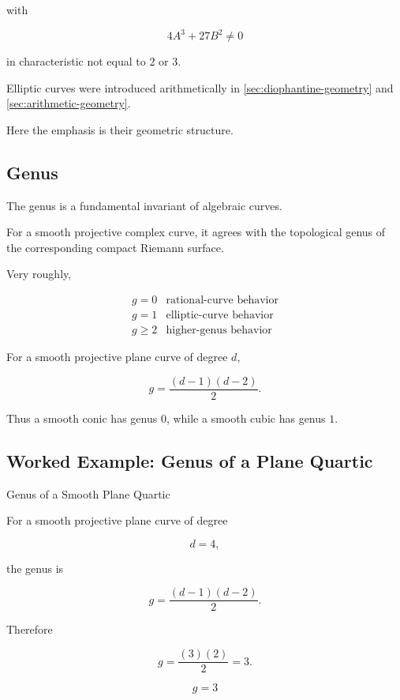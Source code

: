 with

\[
4A^3+27B^2\neq0
\]

in characteristic not equal to \(2\) or \(3\).

Elliptic curves were introduced arithmetically in
\cref{sec:diophantine-geometry} and
\cref{sec:arithmetic-geometry}.

Here the emphasis is their geometric structure.

\subsection{Genus}
\label{subsec:algebraic-genus}

The genus is a fundamental invariant of algebraic curves.

For a smooth projective complex curve, it agrees with the topological genus
of the corresponding compact Riemann surface.

Very roughly,

\[
\boxed{
\begin{array}{c|c}
g=0 & \text{rational-curve behavior}\\
g=1 & \text{elliptic-curve behavior}\\
g\geq2 & \text{higher-genus behavior}
\end{array}
}
\]

For a smooth projective plane curve of degree \(d\),

\[
\boxed{
g=
\frac{(d-1)(d-2)}{2}.
}
\]

Thus a smooth conic has genus \(0\), while a smooth cubic has genus \(1\).

\subsection{Worked Example: Genus of a Plane Quartic}
\label{subsec:worked-genus-quartic}

\begin{workedexamplebox}{Genus of a Smooth Plane Quartic}

For a smooth projective plane curve of degree

\[
d=4,
\]

the genus is

\[
g
=
\frac{(d-1)(d-2)}{2}.
\]

Therefore

\[
g
=
\frac{(3)(2)}{2}
=
3.
\]

\begin{answerbox}
\[
\boxed{g=3}
\]
\end{answerbox}
\end{workedexamplebox}

